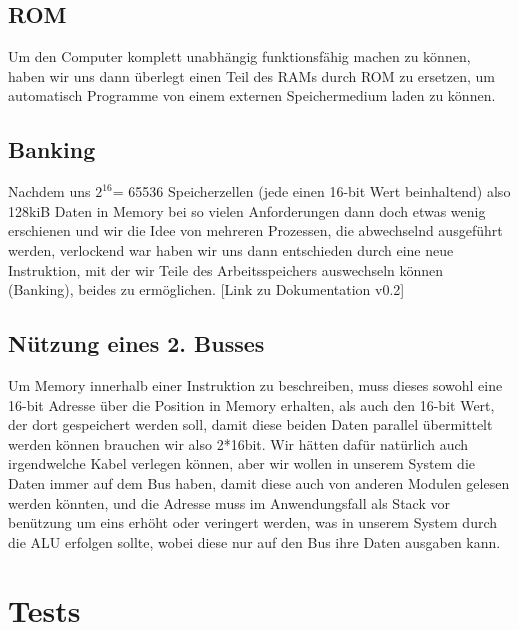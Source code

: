 \documentclass{scrartcl}
\begin{document}
    \subsection{ROM}
    Um den Computer komplett unabhängig funktionsfähig machen zu können, haben wir uns dann überlegt einen Teil des RAMs durch ROM zu ersetzen, um automatisch Programme von einem externen Speichermedium laden zu können.
    \subsection{Banking}
    Nachdem uns $2^{16}$= 65536 Speicherzellen (jede einen 16-bit Wert beinhaltend) also 128kiB Daten in Memory bei so vielen Anforderungen dann doch etwas wenig erschienen
    und wir die Idee von mehreren Prozessen, die abwechselnd ausgeführt werden, verlockend war haben wir uns dann entschieden durch eine neue Instruktion, mit der wir Teile des Arbeitsspeichers auswechseln können (Banking),
    beides zu ermöglichen. [Link zu Dokumentation v0.2]


    \subsection{Nützung eines 2. Busses}

    Um Memory innerhalb einer Instruktion zu beschreiben, muss dieses sowohl eine 16-bit Adresse über die Position in Memory erhalten,
    als auch den 16-bit Wert, der dort gespeichert werden soll,
    damit diese beiden Daten parallel übermittelt werden können brauchen wir also 2*16bit.
    Wir hätten dafür natürlich auch irgendwelche Kabel verlegen können, aber wir wollen in unserem System die Daten immer auf dem Bus haben, damit diese auch von anderen Modulen gelesen werden könnten, und die Adresse muss im Anwendungsfall als Stack vor benützung um eins erhöht oder veringert werden, was in unserem System durch die ALU erfolgen sollte, wobei diese nur auf den Bus ihre Daten ausgaben kann.

    \section{Tests}
\end{document}

